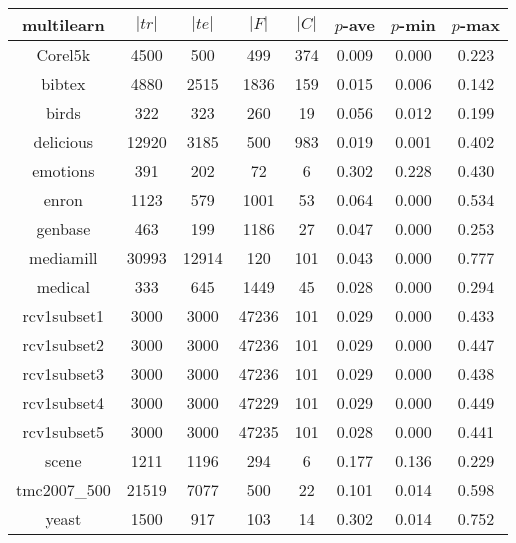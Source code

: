 \documentclass[10pt,a4paper]{article}
\begin{document}
\begin{table}[b]
\begin{tabular}{|c||c|c|c|c|c|c|c|}\hline
    multilearn & $|tr|$ & $|te|$ & $|F|$ & $|C|$ & $p$-ave & $p$-min & $p$-max \\\hline
Corel5k & 4500 & 500 & 499 & 374 & 0.009 & 0.000 & 0.223\\\hline
bibtex & 4880 & 2515 & 1836 & 159 & 0.015 & 0.006 & 0.142\\\hline
birds & 322 & 323 & 260 & 19 & 0.056 & 0.012 & 0.199\\\hline
delicious & 12920 & 3185 & 500 & 983 & 0.019 & 0.001 & 0.402\\\hline
emotions & 391 & 202 & 72 & 6 & 0.302 & 0.228 & 0.430\\\hline
enron & 1123 & 579 & 1001 & 53 & 0.064 & 0.000 & 0.534\\\hline
genbase & 463 & 199 & 1186 & 27 & 0.047 & 0.000 & 0.253\\\hline
mediamill & 30993 & 12914 & 120 & 101 & 0.043 & 0.000 & 0.777\\\hline
medical & 333 & 645 & 1449 & 45 & 0.028 & 0.000 & 0.294\\\hline
rcv1subset1 & 3000 & 3000 & 47236 & 101 & 0.029 & 0.000 & 0.433\\\hline
rcv1subset2 & 3000 & 3000 & 47236 & 101 & 0.029 & 0.000 & 0.447\\\hline
rcv1subset3 & 3000 & 3000 & 47236 & 101 & 0.029 & 0.000 & 0.438\\\hline
rcv1subset4 & 3000 & 3000 & 47229 & 101 & 0.029 & 0.000 & 0.449\\\hline
rcv1subset5 & 3000 & 3000 & 47235 & 101 & 0.028 & 0.000 & 0.441\\\hline
scene & 1211 & 1196 & 294 & 6 & 0.177 & 0.136 & 0.229\\\hline
tmc2007\_500 & 21519 & 7077 & 500 & 22 & 0.101 & 0.014 & 0.598\\\hline
yeast & 1500 & 917 & 103 & 14 & 0.302 & 0.014 & 0.752\\\hline
\end{tabular}
\end{table}
\end{document}
